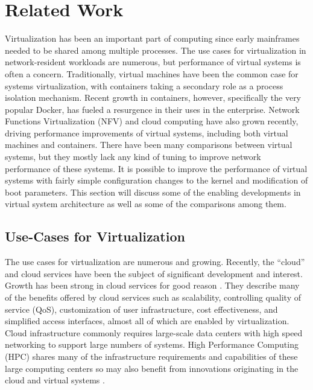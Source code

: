 \chapter{Related Work}
\label{cha:related_work}
\label{sec:related_work}
Virtualization has been an important part of computing since early mainframes needed to be shared among multiple processes.
The use cases for virtualization in network-resident workloads are numerous, but performance of virtual systems is often a concern.
Traditionally, virtual machines have been the common case for systems virtualization, with containers taking a secondary role as a process isolation mechanism.
Recent growth in containers, however, specifically the very popular Docker, has fueled a resurgence in their uses in the enterprise.
Network Functions Virtualization (NFV) and cloud computing have also grown recently, driving performance improvements of virtual systems, including both virtual machines and containers.
There have been many comparisons between virtual systems, but they mostly lack any kind of tuning to improve network performance of these systems.
It is possible to improve the performance of virtual systems with fairly simple configuration changes to the kernel and modification of boot parameters.
This section will discuss some of the enabling developments in virtual system architecture as well as some of the comparisons among them.  

\section{Use-Cases for Virtualization} %
\label{sec:usecasesvt}
The use cases for virtualization are numerous and growing. 
Recently, the ``cloud'' and cloud services have been the subject of significant development and interest.
Growth has been strong in cloud services for good reason \autocite{_younge_1}.
They describe many of the benefits offered by cloud services such as scalability, controlling quality of service (QoS), customization of user infrastructure, cost effectiveness, and simplified access interfaces, almost all of which are enabled by virtualization.  
Cloud infrastructure commonly requires large-scale data centers with high speed networking to support large numbers of systems.  
High Performance Computing (HPC) shares many of the infrastructure requirements and capabilities of these large computing centers so may also benefit from innovations originating in the cloud and virtual systems \autocite{xavier2013performance, _younge_1}.


